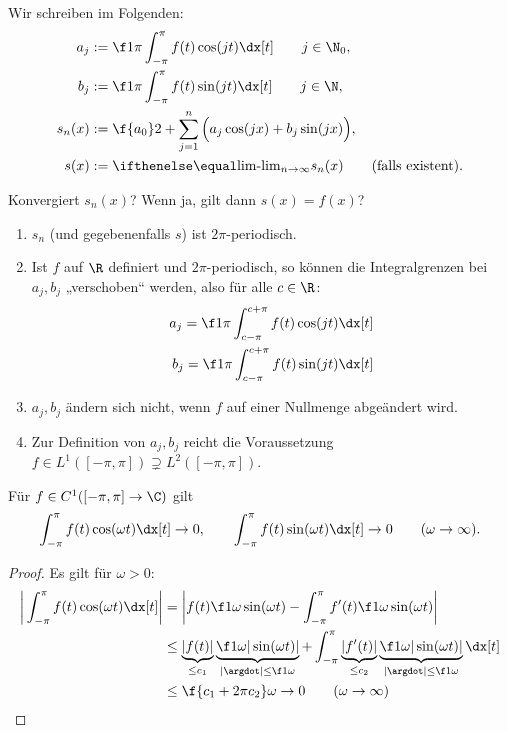 \begin{nt}[Notation] \label{3.21}
	Wir schreiben im Folgenden:
	\begin{align*}
		a_j &:= \f 1{\pi} \int_{-\pi}^{\pi} f(t) \cos(jt) \dx[t] \qquad j\in \N_0, \\
		b_j &:= \f 1{\pi} \int_{-\pi}^{\pi} f(t) \sin(jt) \dx[t] \qquad j\in \N, \\
		s_n(x) &:= \f {a_0}2 + \sum_{j=1}^n \Big( a_j \cos(jx) + b_j \sin(jx) \Big), \\
		s(x) &:= \lim_{n\to \infty} s_n(x) \qquad \text{(falls existent)}.
	\end{align*}
\end{nt}

Konvergiert $s_n(x)$? Wenn ja, gilt dann $s(x) = f(x)$?

\begin{nt}[Beobachtungen] \label{3.22}
	\begin{enumerate}[1)]
		\item
			$s_n$ (und gegebenenfalls $s$) ist $2\pi$-periodisch.
		\item
			Ist $f$ auf $\R$ definiert und $2\pi$-periodisch, so können die Integralgrenzen bei $a_j, b_j$ „verschoben“ werden, also für alle $c \in \R$:
			\begin{align*}
				a_j = \f 1{\pi} \int_{c-\pi}^{c+\pi} f(t) \cos(jt) \dx[t] \\
				b_j = \f 1{\pi} \int_{c-\pi}^{c+\pi} f(t) \sin(jt) \dx[t]
			\end{align*}
		\item
			$a_j, b_j$ ändern sich nicht, wenn $f$ auf einer Nullmenge abgeändert wird.
		\item
			Zur Definition von $a_j, b_j$ reicht die Voraussetzung $f \in L^1([-\pi, \pi]) \supsetneq L^2([-\pi, \pi])$.
	\end{enumerate}
\end{nt}

\begin{lem} \label{3.23}
	Für $f \in C^1([-\pi, \pi] \to \C)$ gilt
	\[
		\int_{-\pi}^{\pi} f(t) \cos(\omega t) \dx[t] \to 0, \qquad
		\int_{-\pi}^{\pi} f(t) \sin(\omega t) \dx[t] \to 0 \qquad (\omega \to \infty).
	\]
	\begin{proof}
		Es gilt für $\omega > 0$:
		\begin{align*}
			\bigg| \int_{-\pi}^{\pi} f(t) \cos(\omega t) \dx[t] \bigg|
			&= \bigg| f(t) \f 1{\omega} \sin(\omega t) - \int_{-\pi}^{\pi} f'(t) \f 1{\omega} \sin(\omega t) \bigg| \\
			&\le \underbrace{|f(t)|}_{\le c_1} \underbrace{\f 1{\omega} |\sin(\omega t)|}_{|\argdot| \le \f 1{\omega}} + \int_{-\pi}^{\pi} \underbrace{|f'(t)|}_{\le c_2} \underbrace{\f 1{\omega} |\sin(\omega t)|}_{|\argdot|\le \f 1{\omega}} \dx[t] \\
			&\le \f {c_1 + 2\pi c_2}\omega \to 0 \qquad (\omega \to \infty)
		\end{align*}
	\end{proof}
\end{lem}

